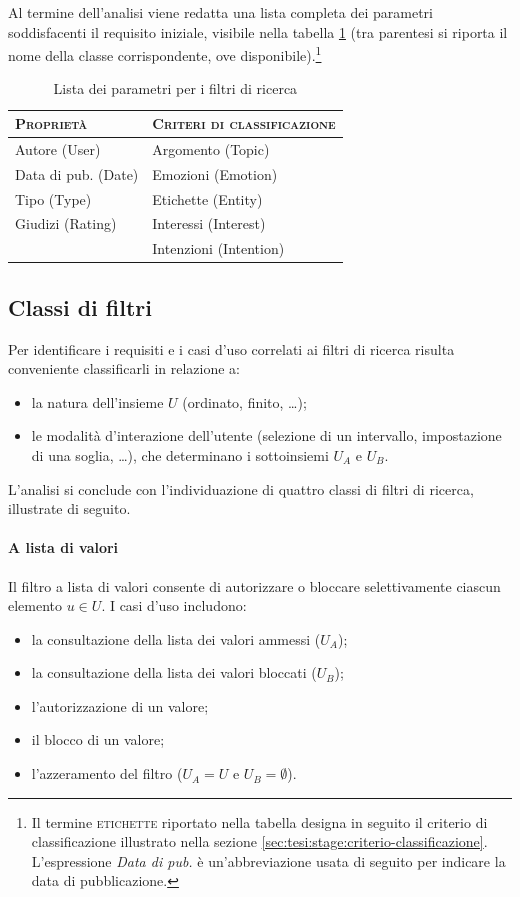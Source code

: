 Al termine dell'analisi viene redatta una lista completa dei parametri soddisfacenti il requisito iniziale, visibile nella tabella \ref{tab:tesi:stage:parametri-filtri} (tra parentesi si riporta il nome della classe corrispondente, ove disponibile).\footnote{Il termine \textsc{etichette} riportato nella tabella designa in seguito il criterio di classificazione illustrato nella sezione \ref{sec:tesi:stage:criterio-classificazione}. L'espressione \textit{Data di pub.} è un'abbreviazione usata di seguito per indicare la data di pubblicazione.}
\begin{table}[ht]
\centering
\begin{tabular}{|l|l|}
\hline
\textsc{Proprietà} & \textsc{Criteri di classificazione} \\ \hline
Autore (\textsf{User}) & Argomento (\textsf{Topic})\\
Data di pub. (\textsf{Date}) & Emozioni (\textsf{Emotion}) \\
Tipo (\textsf{Type}) & Etichette (\textsf{Entity}) \\
Giudizi (\textsf{Rating}) & Interessi (\textsf{Interest}) \\
& Intenzioni (\textsf{Intention}) \\ \hline
\end{tabular}
\caption{Lista dei parametri per i filtri di ricerca}
\label{tab:tesi:stage:parametri-filtri}
\end{table}

\subsection{Classi di filtri}
Per identificare i requisiti e i casi d'uso correlati ai filtri di ricerca risulta conveniente classificarli in relazione a:
\begin{itemize}
  \item la natura dell'insieme $U$ (ordinato, finito, \ldots);
  \item le modalità d'interazione dell'utente (selezione di un intervallo, impostazione di una soglia, \ldots), che determinano i sottoinsiemi $U_A$ e $U_B$.
\end{itemize}

L'analisi si conclude con l'individuazione di quattro classi di filtri di ricerca, illustrate di seguito.

\paragraph{A lista di valori}
Il filtro a lista di valori consente di autorizzare o bloccare selettivamente ciascun elemento $u \in U$. I casi d'uso includono:
\begin{itemize}
	\item la consultazione della lista dei valori ammessi ($U_A$);
	\item la consultazione della lista dei valori bloccati ($U_B$);
	\item l'autorizzazione di un valore;
	\item il blocco di un valore;
	\item l'azzeramento del filtro ($U_A = U$ e $U_B = \emptyset$).
\end{itemize}
	

